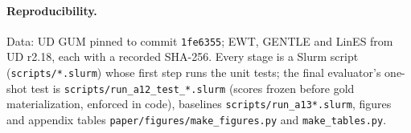 \paragraph{Reproducibility.} Data: UD GUM pinned to commit \texttt{1fe6355}; EWT, GENTLE and LinES from UD r2.18, each
with a recorded SHA-256. Every stage is a Slurm script (\texttt{scripts/*.slurm}) whose first step runs the unit tests;
the final evaluator's one-shot test is \texttt{scripts/run\_a12\_test\_*.slurm} (scores frozen before gold
materialization, enforced in code), baselines \texttt{scripts/run\_a13*.slurm}, figures and appendix tables
\texttt{paper/figures/make\_figures.py} and \texttt{make\_tables.py}.
